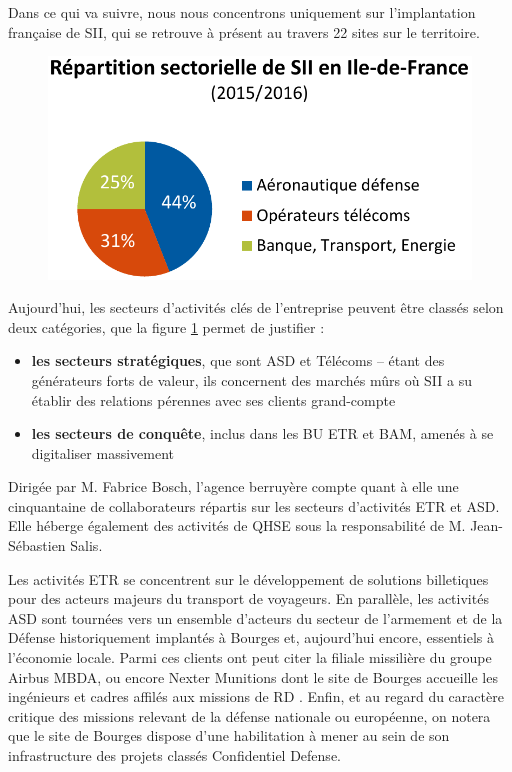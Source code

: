 Dans ce qui va suivre, nous nous concentrons uniquement sur l'implantation française de SII, qui se retrouve à présent au travers 22 sites sur le territoire.  

\begin{figure}[h]
    \centering
    \includegraphics[width=.5\linewidth]{figures/BU-IDF}
    \label{fig:Rep-sectorielle}
\end{figure}

Aujourd'hui, les secteurs d'activités clés de l'entreprise peuvent être classés selon deux catégories\cite{Bib_memento_ag_idf}, que la figure \ref{fig:Rep-sectorielle} permet de justifier : 

\begin{itemize}
  \item \textbf{les secteurs stratégiques}, que sont \gls{ASD} et Télécoms -- étant des générateurs forts de valeur, ils concernent des marchés mûrs où SII a su établir des relations pérennes avec ses clients grand-compte
  \item \textbf{les secteurs de conquête}, inclus dans les \gls{BU} \gls{ETR} et \gls{BAM}, amenés à se digitaliser massivement
\end{itemize}

Dirigée par M. Fabrice Bosch, l'agence berruyère compte quant à elle une cinquantaine de collaborateurs répartis sur les secteurs d'activités \gls{ETR} et \gls{ASD}. 
Elle héberge également des activités de \gls{QHSE} sous la responsabilité de M. Jean-Sébastien Salis.  

Les activités \gls{ETR} se concentrent sur le développement de solutions billetiques pour des acteurs majeurs du transport de voyageurs. 
En parallèle, les activités \gls{ASD} sont tournées vers un ensemble d'acteurs du secteur de l'armement et de la Défense historiquement implantés à Bourges et, aujourd'hui encore, essentiels à l'économie locale\cite{Bib_def_cher}. 
Parmi ces clients ont peut citer la filiale missilière du groupe Airbus MBDA, ou encore Nexter Munitions dont le site de Bourges accueille les ingénieurs et cadres affilés aux missions de \gls{RD} . 
Enfin, et au regard du caractère critique des missions relevant de la défense nationale ou européenne, on notera que le site de Bourges dispose d'une habilitation à mener au sein de son infrastructure des projets classés Confidentiel
Defense. 

